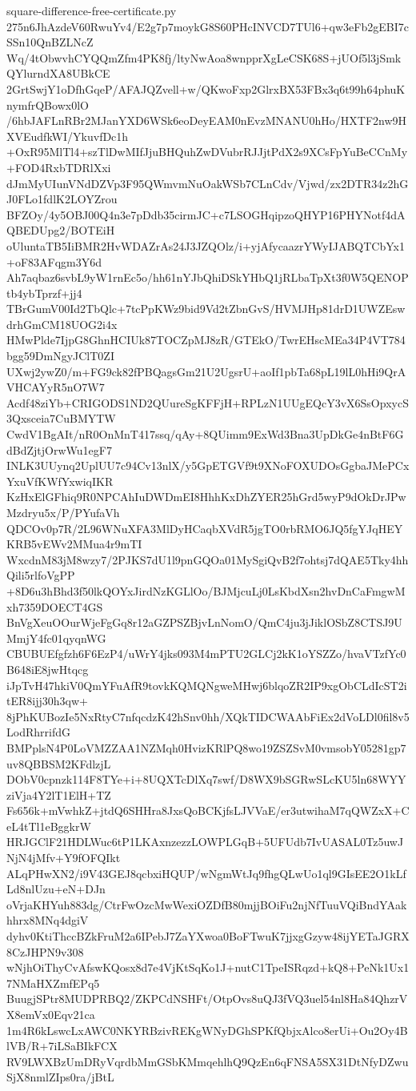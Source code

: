 \documentclass[11pt]{article}
\theoremstyle{definition}
\theoremstyle{remark}
\begin{document}
\begin{filecontents*}[overwrite]{square-difference-free-certificate.py}
275n6JhAzdeV60RwuYv4/E2g7p7moykG8S60PHcINVCD7TUl6+qw3eFb2gEBI7cSSn10QnBZLNcZ
Wq/4tObwvhCYQQmZfm4PK8fj/ltyNwAoa8wnpprXgLeCSK68S+jUOf5l3jSmkQYlurndXA8UBkCE
2GrtSwjY1oDfhGqeP/AFAJQZvell+w/QKwoFxp2GlrxBX53FBx3q6t99h64phuKnymfrQBowx0lO
/6hbJAFLnRBr2MJanYXD6WSk6eoDeyEAM0nEvzMNANU0hHo/HXTF2nw9HXVEudfkWI/YkuvfDc1h
+OxR95MlTl4+szTlDwMIfJjuBHQuhZwDVubrRJJjtPdX2s9XCsFpYuBeCCnMy+FOD4RxbTDRlXxi
dJmMyUIunVNdDZVp3F95QWmvmNuOakWSb7CLnCdv/Vjwd/zx2DTR34z2hGJ0FLo1fdlK2LOYZrou
BFZOy/4y5OBJ00Q4n3e7pDdb35cirmJC+c7LSOGHqipzoQHYP16PHYNotf4dAQBEDUpg2/BOTEiH
oUluntaTB5IiBMR2HvWDAZrAs24J3JZQOlz/i+yjAfycaazrYWyIJABQTCbYx1+oF83AFqgm3Y6d
Ah7aqbaz6svbL9yW1rnEc5o/hh61nYJbQhiDSkYHbQ1jRLbaTpXt3f0W5QENOPtb4ybTprzf+jj4
TBrGumV00Id2TbQlc+7tcPpKWz9bid9Vd2tZbnGvS/HVMJHp81drD1UWZEswdrhGmCM18UOG2i4x
HMwPlde7IjpG8GhnHCIUk87TOCZpMJ8zR/GTEkO/TwrEHscMEa34P4VT784bgg59DmNgyJClT0ZI
UXwj2ywZ0/m+FG9ck82fPBQagsGm21U2UgsrU+aoIf1pbTa68pL19lL0hHi9QrAVHCAYyR5nO7W7
Acdf48ziYb+CRIGODS1ND2QUureSgKFFjH+RPLzN1UUgEQcY3vX6SsOpxycS3Qxsceia7CuBMYTW
CwdV1BgAIt/nR0OnMnT417ssq/qAy+8QUimm9ExWd3Bna3UpDkGe4nBtF6GdBdZjtjOrwWu1egF7
INLK3UUynq2UplUU7c94Cv13nlX/y5GpETGVf9t9XNoFOXUDOsGgbaJMePCxYxuVfKWfYxwiqIKR
KzHxElGFhiq9R0NPCAhIuDWDmEI8HhhKxDhZYER25hGrd5wyP9dOkDrJPwMzdryu5x/P/PYufaVh
QDCOv0p7R/2L96WNuXFA3MlDyHCaqbXVdR5jgTO0rbRMO6JQ5fgYJqHEYKRB5vEWv2MMua4r9mTI
WxcdnM83jM8wzy7/2PJKS7dU1l9pnGQOa01MySgiQvB2f7ohtsj7dQAE5Tky4hhQili5rlfoVgPP
+8D6u3hBhd3f50lkQOYxJirdNzKGLlOo/BJMjcuLj0LsKbdXsn2hvDnCaFmgwMxh7359DOECT4GS
BnVgXeuOOurWjeFgGq8r12aGZPSZBjvLnNomO/QmC4ju3jJiklOSbZ8CTSJ9UMmjY4fc01qyqnWG
CBUBUEfgfzh6F6EzP4/uWrY4jks093M4mPTU2GLCj2kK1oYSZZo/hvaVTzfYc0B648iE8jwHtqcg
iJpTvH47hkiV0QmYFuAfR9tovkKQMQNgweMHwj6blqoZR2IP9xgObCLdIcST2itER8ijj30h3qw+
8jPhKUBozIe5NxRtyC7nfqcdzK42hSnv0hh/XQkTIDCWAAbFiEx2dVoLDl0fil8v5LodRhrrifdG
BMPplsN4P0LoVMZZAA1NZMqh0HvizKRlPQ8wo19ZSZSvM0vmsobY05281gp7uv8QBBSM2KFdlzjL
DObV0cpnzk114F8TYe+i+8UQXTcDlXq7swf/D8WX9bSGRwSLcKU5ln68WYYziVja4Y2lT1ElH+TZ
Fs656k+mVwhkZ+jtdQ6SHHra8JxsQoBCKjfsLJVVaE/er3utwihaM7qQWZxX+CeL4tTl1eBggkrW
HRJGClF21HDLWuc6tP1LKAxnzezzLOWPLGqB+5UFUdb7IvUASAL0Tz5uwJNjN4jMfv+Y9fOFQIkt
ALqPHwXN2/i9V43GEJ8qcbxiHQUP/wNgmWtJq9fhgQLwUo1ql9GIsEE2O1kLfLd8nlUzu+eN+DJn
oVrjaKHYuh883dg/CtrFwOzcMwWexiOZDfB80mjjBOiFu2njNfTuuVQiBndYAakhhrx8MNq4dgiV
dyhv0KtiThccBZkFruM2a6IPebJ7ZaYXwoa0BoFTwuK7jjxgGzyw48ijYETaJGRX8CzJHPN9v308
wNjhOiThyCvAfswKQosx8d7e4VjKtSqKo1J+nutC1TpeISRqzd+kQ8+PeNk1Ux17NMaHXZmfEPq5
BuugjSPtr8MUDPRBQ2/ZKPCdNSHFt/OtpOvs8uQJ3fVQ3uel54nl8Ha84QhzrVX8emVx0Eqv21ca
1m4R6kLswcLxAWC0NKYRBzivREKgWNyDGhSPKfQbjxAlco8erUi+Ou2Oy4BlVB/R+7iLSaBIkFCX
RV9LWXBzUmDRyVqrdbMmGSbKMmqehlhQ9QzEn6qFNSA5SX31DtNfyDZwuSjX8nmlZIps0ra/jBtL

\end{filecontents*}
\end{document}
